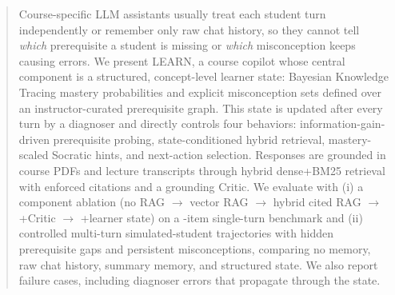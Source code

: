 \begin{abstract}
Course-specific LLM assistants usually treat each student turn independently or remember only raw chat history, so they cannot tell \emph{which} prerequisite a student is missing or \emph{which} misconception keeps causing errors. We present LEARN, a course copilot whose central component is a structured, concept-level learner state: Bayesian Knowledge Tracing mastery probabilities and explicit misconception sets defined over an instructor-curated prerequisite graph. This state is updated after every turn by a diagnoser and directly controls four behaviors: information-gain-driven prerequisite probing, state-conditioned hybrid retrieval, mastery-scaled Socratic hints, and next-action selection. Responses are grounded in course PDFs and lecture transcripts through hybrid dense+BM25 retrieval with enforced citations and a grounding Critic.
We evaluate with (i) a component ablation (no RAG $\rightarrow$ vector RAG $\rightarrow$ hybrid cited RAG $\rightarrow$ +Critic $\rightarrow$ +learner state) on a -item single-turn benchmark and (ii)  controlled multi-turn simulated-student trajectories with hidden prerequisite gaps and persistent misconceptions, comparing no memory, raw chat history, summary memory, and structured state.
We also report failure cases, including diagnoser errors that propagate through the state.
\end{abstract}
